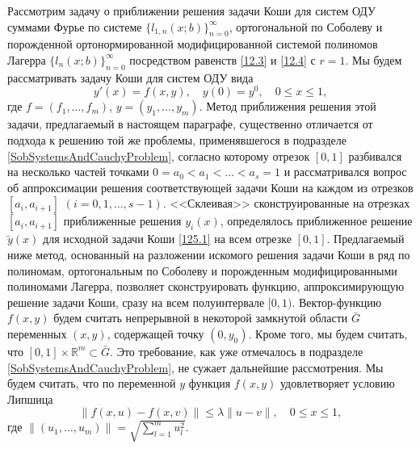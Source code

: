 Рассмотрим задачу о приближении решения задачи Коши для систем ОДУ  суммами  Фурье по системе $\{l_{1,n}(x;b)\}_{n=0}^\infty$, ортогональной по Соболеву и порожденной ортонормированной модифицированной системой полиномов Лагерра $\{l_{n}(x;b)\}_{n=0}^\infty$ посредством равенств \eqref{12.3} и \eqref{12.4} с $r=1$.
Мы будем рассматривать задачу Коши для систем ОДУ вида
\begin{equation}\label{125.1}
y'(x)=f(x,y), \quad y(0)=y^0,\quad 0\le x\le 1,
\end{equation}
где  $f=(f_1, \ldots, f_m)$, $y=(y_1, \ldots, y_m)$. Метод приближения решения этой задачи, предлагаемый в настоящем параграфе, существенно отличается от подхода к решению той же проблемы, применявшегося в подразделе \ref{SobSystemsAndCauchyProblem}, согласно которому  отрезок $[0,1]$ разбивался на несколько частей точками $0=a_0<a_1<\ldots<a_s=1$ и рассматривался вопрос об аппроксимации решения соответствующей задачи Коши на каждом из отрезков $[a_i,a_{i+1}]$ $(i=0,1,\ldots,s-1)$.  <<Склеивая>> сконструированные на отрезках $[a_i,a_{i+1}]$ приближенные решения $y_i(x)$, определялось приближенное решение $\tilde y(x)$ для исходной задачи Коши \eqref{125.1} на всем отрезке $[0,1]$.   Предлагаемый ниже метод, основанный на разложении искомого решения задачи Коши  в ряд по полиномам, ортогональным по Соболеву и порожденным  модифицированными полиномами Лагерра, позволяет сконструировать функцию, аппроксимирующую решение задачи Коши, сразу на всем полуинтервале $[0,1)$.  Вектор-функцию   $f(x,y)$  будем считать непрерывной в некоторой замкнутой  области $\bar G$ переменных $(x,y)$, содержащей точку $(0,y_0)$. Кроме того, мы будем  считать, что  $[0,1]\times\mathbb{R}^m\subset\bar G$. Это требование, как уже отмечалось в подразделе \ref{SobSystemsAndCauchyProblem}, не сужает дальнейшие рассмотрения.
Мы будем считать, что по переменной $y$ функция $f(x,y)$ удовлетворяет условию Липшица
\begin{equation}\label{125.2}
\|f(x,u)-f(x,v)\|\le \lambda\|u-v\|, \quad 0\le x \le 1,
\end{equation}
где $\|(u_1,\ldots,u_m)\|=\sqrt{\sum_{l=1}^mu_l^2}$.

